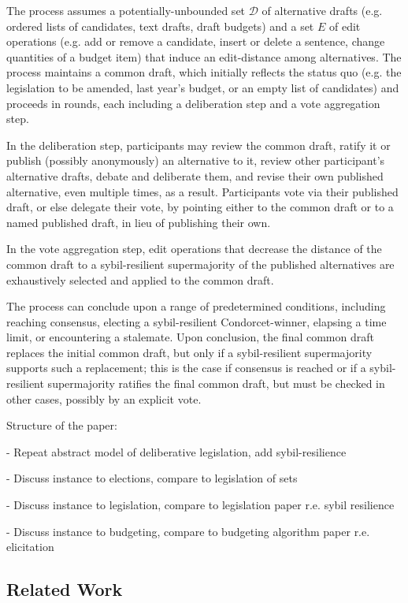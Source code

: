 \documentclass{llncs}
\newcommand{\calD}{\mathcal{D}}
\begin{document}
The process assumes a potentially-unbounded set $\calD$ of alternative drafts (e.g. ordered lists of candidates, text drafts, draft budgets) and a set $E$ of edit operations (e.g. add or remove a candidate, insert or delete a sentence, change quantities of a budget item) that induce an edit-distance among alternatives. The process maintains a common draft, which initially reflects the status quo (e.g. the legislation to be amended, last year's budget, or an empty list of candidates) and proceeds in rounds, each including a deliberation step and a vote aggregation step.

In the deliberation step, participants may review the common draft, ratify it or publish (possibly anonymously) an alternative to it, review other participant's alternative drafts, debate and deliberate them, and revise their own published alternative, even multiple times, as a result. Participants vote via their published draft, or else delegate their vote, by pointing either to the common draft or to a named published draft, in lieu of publishing their own.

In the vote aggregation step, edit operations that decrease the distance of the common draft to a sybil-resilient supermajority of the published alternatives are exhaustively selected and applied to the common draft. 

The process can conclude upon a range of predetermined conditions, including reaching consensus, electing a sybil-resilient Condorcet-winner, elapsing a time limit, or encountering a stalemate.  Upon conclusion, the final common draft replaces the initial common draft, but only if a sybil-resilient supermajority supports such a replacement; this is the case if consensus is reached or if a sybil-resilient supermajority ratifies the final common draft, but must be checked in other cases, possibly by an explicit vote.



Structure of the paper:

- Repeat abstract model of deliberative legislation, add sybil-resilience

- Discuss instance to elections, compare to legislation of sets

- Discuss instance to legislation, compare to legislation paper r.e. sybil resilience

- Discuss instance to budgeting, compare to budgeting algorithm paper r.e. elicitation


\subsection{Related Work}
\end{document}
